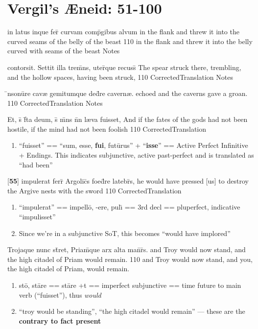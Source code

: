 \section{Vergil's {\AE}neid: 51-100} %

\latline
  {in latus inque fer\={\macron {\i}} curvam comp\={}gibus alvum}
  { in the flank and threw it into the curved seams of the belly of the beast }
  {110}
  { in the flank and threw it into the belly curved with seams of the beast }
  { Notes }


\latline
  {contorsit.  Settit illa trem\={}ns, uter\={}que recuss\={}}
  { The spear struck there, trembling, and the hollow spaces, having been struck, }
  {110}
  { CorrectedTranslation }
  { Notes }


\latline
  {\={\macron {\i}}nsonu\={}re cav{\ae} gemitumque ded\={}re cavern{\ae}.}
  { echoed and the caverns gave a groan. }
  {110}
  { CorrectedTranslation }
  { Notes }


\latline
  {Et, s\={\macron {\i}} f\={}ta deum, s\={\macron {\i}} m\={}ns n\={}n l{\ae}va fuisset,}
  { And if the fates of the gods had not been hostile, if the mind had not been foolish  }
  {110}
  { CorrectedTranslation }
  { \begin{enumerate}
  	\item ``fuisset'' == ``sum, esse, \textbf{fui}, fut\={u}rus'' + ``\textbf{isse}'' == Active Perfect Infinitive + Endings.  This indicates subjunctive, active past-perfect and is translated as ``had been''
  \end{enumerate} }


\latline
  {[\textbf{55}] impulerat ferr\={} Argolic\={}s foed\={}re latebr\={}s,}
  { he would have pressed [us] to destroy the Argive nests with the sword }
  {110}
  { CorrectedTranslation }
  { \begin{enumerate}
  	\item ``impulerat'' == impell\={o}, -ere, pul\={\i} == 3rd decl == pluperfect, indicative ``impulisset'' 
  	\item Since we're in a subjunctive SoT, this becomes ``would have implored''
  \end{enumerate} }


\latline
  {Trojaque nunc st\={}ret, Priam\={\macron {\i}}que arx alta man\={}r\={}s.}
  { and Troy would now stand, and the high citadel of Priam would remain. }
  {110}
  { and Troy would now stand, and you, the high citadel of Priam, would remain. }
  { \begin{enumerate}
  	\item st\={o}, st\={a}re == st\={a}re +t == imperfect subjunctive == time future to main verb (``fuisset''), thus \emph{would}
  	\item ``troy would be standing'', ``the high citadel would remain'' --- these are the \textbf{contrary to fact present}
  \end{enumerate} }


